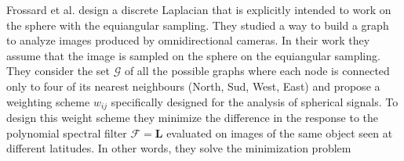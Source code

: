 Frossard et al. \cite{Frossard2017GraphBasedCO} design a discrete Laplacian that is explicitly intended to work on the sphere with the equiangular sampling. They studied a way to build a graph to analyze images produced by omnidirectional cameras. In their work they assume that the image is sampled on the sphere on the equiangular sampling. They consider the set $\mathcal G$ of all the possible graphs where each node is connected only to four of its nearest neighbours (North, Sud, West, East) and propose a weighting scheme $w_{ij}$ specifically designed for the analysis of spherical signals. To design this weight scheme they minimize the difference in the response to the polynomial spectral filter $\mathcal F = \mathbf L$ evaluated on images of the same object seen at different latitudes. In other words, they solve the minimization problem

